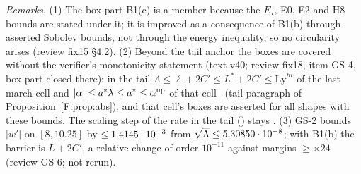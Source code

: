 \documentclass[11pt]{article}
\begin{document}
\noindent\emph{Remarks.} (1) The box part B1(c) is a member because the $E_I$, E0, E2 and H8 bounds are stated under it; it is improved as a consequence of B1(b) through asserted Sobolev bounds, not through the energy inequality, so no circularity arises (review fix15 \S4.2). (2) Beyond the tail anchor the boxes are covered without the verifier's monotonicity statement (text v40; review fix18, item GS-4, box part closed there): in the tail $\Lambda\le\ell+2C'\le L^*+2C'\le\mathrm{Ly}^{hi}$ of the last march cell and $|\alpha|\le a^*\lambda\le a^*\le\alpha^{\rm up}$ of that cell \tC\ (tail paragraph of Proposition~\ref{F:prop:abs}), and that cell's boxes are asserted for all shapes with these bounds. The scaling step of the rate in the tail () stays \tR. (3) GS-2 bounds $|w'|$ on $[8,10.25]$ by $\le1.4145\cdot10^{-3}$ from $\sqrt\Lambda\le5.30850\cdot10^{-8}$; with B1(b) the barrier is $L+2C'$, a relative change of order $10^{-11}$ against margins $\ge\times24$ (review GS-6; not rerun).
\ifdefined\stepmain\else
\end{document}
